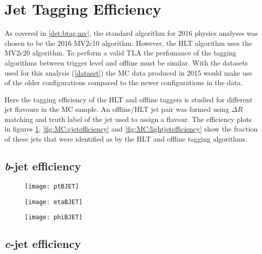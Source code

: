 \section{Jet Tagging Efficiency}

	As covered in \ref{det:btag:mv}, the standard algorithm for 2016 physics analyses was chosen to be the 2016 MV2c10 algorithm. However, the HLT \btag algorithm uses the MV2c20 algorithm. \cite{trig2015} To perform a valid TLA the perfomance of the tagging algorithms between trigger level and offline must be similar. With the datasets used for this analysis (\ref{dataset}) the MC data produced in 2015 would make use of the older configurations compared to the newer configurations in the data. 

	Here the tagging efficiency of the HLT and offline taggers is studied for different jet flavours in the MC sample. An offline/HLT jet pair was formed using $\Delta R$ matching and truth label of the jet used to assign a flavour. The efficiency plots in figures \ref{fig:MC:bjetefficiency}, \ref{fig:MC:cjetefficiency} and \ref{fig:MC:lightjetefficiency} show the fraction of these jets that were identified as \bjets by the HLT and offline tagging algorithms.

	\newpage
	\subsection{\textit{b}-jet efficiency}

		\begin{figure}[h]
			\centering
			\begin{minipage}[h]{0.31\linewidth}
				\texttt{[image: ptBJET]}

			\end{minipage}
			\quad
			\begin{minipage}[h]{0.31\linewidth}
				\texttt{[image: etaBJET]}
			\end{minipage}
			\quad
			\begin{minipage}[h]{0.31\linewidth}
				\texttt{[image: phiBJET]}
			\end{minipage}
			\caption{ }
			\label{fig:MC:bjetefficiency}
		\end{figure}


	\subsection{\textit{c}-jet efficiency}

